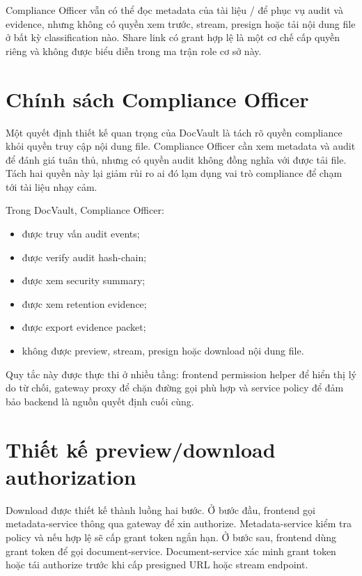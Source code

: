 Compliance Officer vẫn có thể đọc metadata của tài liệu / để phục vụ audit và evidence, nhưng không có quyền xem trước, stream, presign hoặc tải nội dung file ở bất kỳ classification nào. Share link có grant hợp lệ là một cơ chế cấp quyền riêng và không được biểu diễn trong ma trận role cơ sở này.

\section{Chính sách Compliance Officer}

Một quyết định thiết kế quan trọng của DocVault là tách rõ quyền compliance khỏi quyền truy cập nội dung file. Compliance Officer cần xem metadata và audit để đánh giá tuân thủ, nhưng có quyền audit không đồng nghĩa với được tải file. Tách hai quyền này lại giảm rủi ro ai đó lạm dụng vai trò compliance để chạm tới tài liệu nhạy cảm.

Trong DocVault, Compliance Officer:

\begin{itemize}
  \item được truy vấn audit events;
  \item được verify audit hash-chain;
  \item được xem security summary;
  \item được xem retention evidence;
  \item được export evidence packet;
  \item không được preview, stream, presign hoặc download nội dung file.
\end{itemize}

Quy tắc này được thực thi ở nhiều tầng: frontend permission helper để hiển thị lý do từ chối, gateway proxy để chặn đường gọi phù hợp và service policy để đảm bảo backend là nguồn quyết định cuối cùng.

\section{Thiết kế preview/download authorization}

Download được thiết kế thành luồng hai bước. Ở bước đầu, frontend gọi metadata-service thông qua gateway để xin authorize. Metadata-service kiểm tra policy và nếu hợp lệ sẽ cấp grant token ngắn hạn. Ở bước sau, frontend dùng grant token để gọi document-service. Document-service xác minh grant token hoặc tái authorize trước khi cấp presigned URL hoặc stream endpoint.

